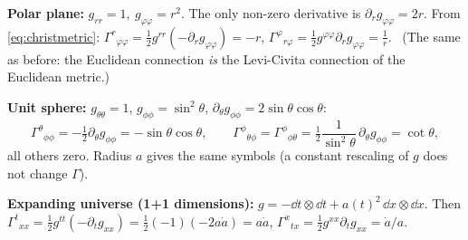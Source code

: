 \begin{example}
\textbf{Polar plane:} $g_{rr}=1,\ g_{\varphi\varphi}=r^2$. The only non-zero derivative is $\partial_rg_{\varphi\varphi}=2r$. From \eqref{eq:christmetric}: $\Gamma^r{}_{\varphi\varphi}=\frac12g^{rr}(-\partial_rg_{\varphi\varphi})=-r$, $\Gamma^\varphi{}_{r\varphi}=\frac12g^{\varphi\varphi}\partial_rg_{\varphi\varphi}=\frac1r$. \checkmark\ (The same as before: the Euclidean connection \emph{is} the Levi-Civita connection of the Euclidean metric.)

\textbf{Unit sphere:} $g_{\theta\theta}=1$, $g_{\phi\phi}=\sin^2\theta$, $\partial_\theta g_{\phi\phi}=2\sin\theta\cos\theta$:
\[
\Gamma^\theta{}_{\phi\phi}=-\tfrac12\partial_\theta g_{\phi\phi}=-\sin\theta\cos\theta,\qquad
\Gamma^\phi{}_{\theta\phi}=\Gamma^\phi{}_{\phi\theta}=\tfrac12\frac{1}{\sin^2\theta}\,\partial_\theta g_{\phi\phi}=\cot\theta,
\]
all others zero. Radius $a$ gives the same symbols (a constant rescaling of $g$ does not change $\Gamma$).

\textbf{Expanding universe (1+1 dimensions):} $g=-\dd t\otimes\dd t+a(t)^2\,\dd x\otimes\dd x$. Then $\Gamma^t{}_{xx}=\tfrac12g^{tt}(-\partial_tg_{xx})=\tfrac12(-1)(-2a\dot a)=a\dot a$, $\Gamma^x{}_{tx}=\tfrac12g^{xx}\partial_tg_{xx}=\dot a/a$.
\end{example}
